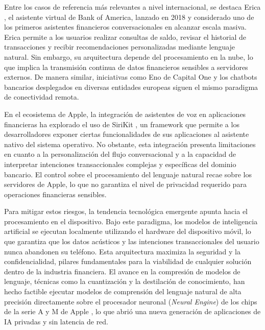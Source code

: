 Entre los casos de referencia más relevantes a nivel internacional, se destaca Erica \citep{bofa2025erica}, el asistente virtual de Bank of America, lanzado en 2018 y considerado uno de los primeros asistentes financieros conversacionales en alcanzar escala masiva. Erica permite a los usuarios realizar consultas de saldo, revisar el historial de transacciones y recibir recomendaciones personalizadas mediante lenguaje natural. Sin embargo, su arquitectura depende del procesamiento en la nube, lo que implica la transmisión continua de datos financieros sensibles a servidores externos. De manera similar, iniciativas como Eno de Capital One \citep{aws2023capitalone} y los chatbots bancarios desplegados en diversas entidades europeas siguen el mismo paradigma de conectividad remota.

En el ecosistema de Apple, la integración de asistentes de voz en aplicaciones financieras ha explorado el uso de SiriKit \citep{apple2025sirikit}, un framework que permite a los desarrolladores exponer ciertas funcionalidades de sus aplicaciones al asistente nativo del sistema operativo. No obstante, esta integración presenta limitaciones en cuanto a la personalización del flujo conversacional y a la capacidad de interpretar intenciones transaccionales complejas y específicas del dominio bancario. El control sobre el procesamiento del lenguaje natural recae sobre los servidores de Apple, lo que no garantiza el nivel de privacidad requerido para operaciones financieras sensibles.

Para mitigar estos riesgos, la tendencia tecnológica emergente apunta hacia el procesamiento en el dispositivo. Bajo este paradigma, los modelos de inteligencia artificial se ejecutan localmente utilizando el hardware del dispositivo móvil, lo que garantiza que los datos acústicos y las intenciones transaccionales del usuario nunca abandonen su teléfono. Esta arquitectura maximiza la seguridad y la confidencialidad, pilares fundamentales para la viabilidad de cualquier solución dentro de la industria financiera. El avance en la compresión de modelos de lenguaje, técnicas como la cuantización y la destilación de conocimiento, han hecho factible ejecutar modelos de comprensión del lenguaje natural de alta precisión directamente sobre el procesador neuronal (\textit{Neural Engine}) de los chips de la serie A y M de Apple \citep{apple2024foundation, apple2022transformers}, lo que abrió una nueva generación de aplicaciones de IA privadas y sin latencia de red.



